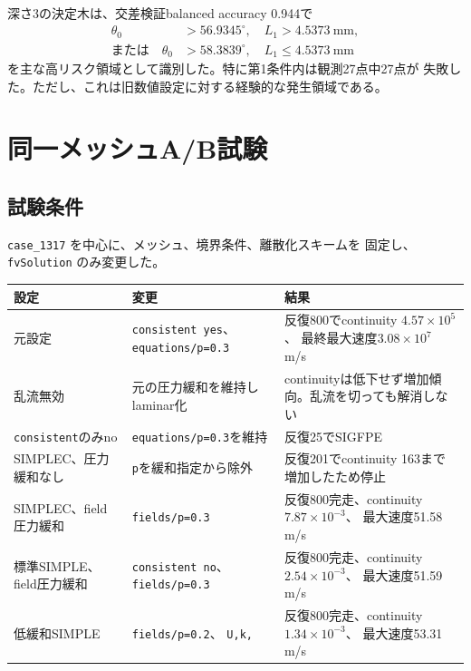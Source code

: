 \documentclass[a4paper,11pt]{article}
\begin{document}
深さ3の決定木は、交差検証balanced accuracy 0.944で
\[
\begin{aligned}
 \theta_0 &>56.9345^\circ,\quad L_1>4.5373~\mathrm{mm},\\
 \text{または}\quad
 \theta_0 &>58.3839^\circ,\quad L_1\leq4.5373~\mathrm{mm}
\end{aligned}
\]
を主な高リスク領域として識別した。特に第1条件内は観測27点中27点が
失敗した。ただし、これは旧数値設定に対する経験的な発生領域である。

\section{同一メッシュA/B試験}

\subsection{試験条件}

\texttt{case\_1317} を中心に、メッシュ、境界条件、離散化スキームを
固定し、\texttt{fvSolution} のみ変更した。

\begin{center}
\small
\begin{tabular}{
  >{\raggedright\arraybackslash}p{37mm}
  >{\raggedright\arraybackslash}p{55mm}
  >{\raggedright\arraybackslash}p{55mm}
}
\toprule
設定 & 変更 & 結果 \\
\midrule
元設定 &
\texttt{consistent yes}、
\texttt{equations/p=0.3} &
反復800でcontinuity $4.57{\times}10^5$、
最終最大速度$3.08{\times}10^7$ m/s \\
乱流無効 &
元の圧力緩和を維持しlaminar化 &
continuityは低下せず増加傾向。乱流を切っても解消しない \\
\texttt{consistent}のみno &
\texttt{equations/p=0.3}を維持 &
反復25でSIGFPE \\
SIMPLEC、圧力緩和なし &
\texttt{p}を緩和指定から除外 &
反復201でcontinuity 163まで増加したため停止 \\
SIMPLEC、field圧力緩和 &
\texttt{fields/p=0.3} &
反復800完走、continuity $7.87{\times}10^{-3}$、
最大速度51.58 m/s \\
標準SIMPLE、field圧力緩和 &
\texttt{consistent no}、
\texttt{fields/p=0.3} &
反復800完走、continuity $2.54{\times}10^{-3}$、
最大速度51.59 m/s \\
低緩和SIMPLE &
\texttt{fields/p=0.2}、
\texttt{U,k,\omega=0.3} &
反復800完走、continuity $1.34{\times}10^{-3}$、
最大速度53.31 m/s \\
\bottomrule
\end{tabular}
\end{center}
\end{document}
